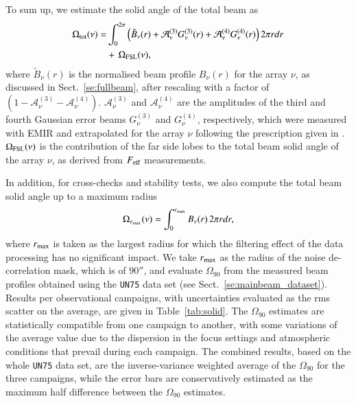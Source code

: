 \documentclass[traditionalabstract]{aa}
\newcommand{\rev}[1]{#1}
\begin{document}
{{\rev To sum up, we estimate the solid angle of the total beam as
\begin{equation}
\begin{split}
  \Omega_{\rm{tot}}(\nu) =& \int_0^{2\pi} \left( \tilde{B}_{\nu}(r)
  + \mathcal{A}_{\nu}^{(3)} G_{\nu}^{(3)}(r) + \mathcal{A}_{\nu}^{(4)}
  G_{\nu}^{(4)}(r) \right)  2 \pi r dr  \\
  &+ \,  \Omega_{\rm{FSL}}
  (\nu),
  \end{split}
  \label{eq:omega_tot}
\end{equation}
where $\tilde{B}_{\nu}(r)$ is the normalised beam profile $B_{\nu}(r)$
for the array $\nu$, as discussed in Sect.~\ref{se:fullbeam}, after
rescaling with a factor of
$(1-\mathcal{A}_{\nu}^{(3)}-\mathcal{A}_{\nu}^{(4)})$.
$\mathcal{A}_{\nu}^{(3)}$ and $\mathcal{A}_{\nu}^{(4)}$ are the
amplitudes of the third and fourth Gaussian error beams
$G_{\nu}^{(3)}$ and $G_{\nu}^{(4)}$, respectively, which were measured
with EMIR and extrapolated for the array $\nu$ following the
prescription given in \citet{Kramer2013}. $\Omega_{\rm{FSL}} (\nu)$ is
the contribution of the far side lobes to the total beam solid angle
of the array $\nu$, as derived from $F_{\rm{eff}}$ measurements.}

{\rev In addition, for cross-checks and stability tests, we also compute the
total beam solid angle up to a maximum radius
\begin{equation}
 \Omega_{r_{\rm{max}}} (\nu) = \int_0^{r_{\rm max}} B_{\nu}(r)  \,  2 \pi r dr, 
\label{eq:omega_rmax}
\end{equation}
where $r_{\rm{max}}$ is taken as the largest radius for which the
filtering effect of the data processing has no significant impact.
We take $r_{\rm{max}}$ as the radius of the noise de-correlation mask,
which is of $90''$, and evaluate {\rev $\Omega_{90}$} from the measured beam profiles
obtained using the {\tt UN75} data set (see Sect.~\ref{se:mainbeam_dataset}).
Results per observational campaigns, with uncertainties evaluated
as the rms scatter on the average, are given in
Table~\ref{tab:solid}. The $\Omega_{90}$ estimates are statistically
compatible from one campaign to another, with some variations of the
average value due to the dispersion in the focus settings and
atmospheric conditions that prevail during each campaign. The combined
results, based on the whole {\tt UN75} data set, are the
inverse-variance weighted average of the $\Omega_{90}$ for the three
campaigns, while the error bars are conservatively estimated as the
maximum half difference between the $\Omega_{90}$ estimates.}
  
}
\end{document}
